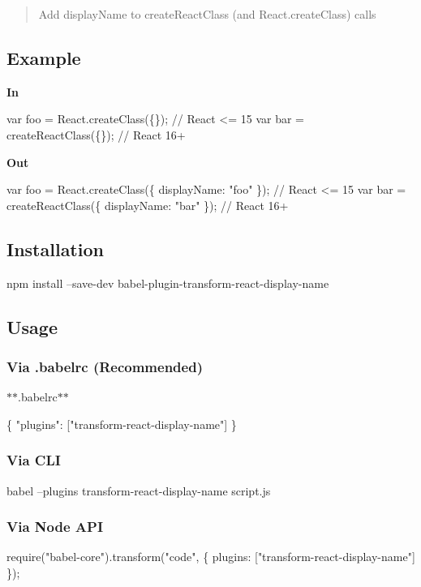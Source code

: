 \begin{quote}
Add display\+Name to {\ttfamily create\+React\+Class} (and {\ttfamily React.\+create\+Class}) calls \end{quote}


\subsection*{Example}

{\bfseries In}


\begin{DoxyCode}
var foo = React.createClass(\{\}); // React <= 15
var bar = createReactClass(\{\});  // React 16+
\end{DoxyCode}


{\bfseries Out}


\begin{DoxyCode}
var foo = React.createClass(\{
  displayName: "foo"
\}); // React <= 15
var bar = createReactClass(\{
  displayName: "bar"
\}); // React 16+
\end{DoxyCode}


\subsection*{Installation}


\begin{DoxyCode}
npm install --save-dev babel-plugin-transform-react-display-name
\end{DoxyCode}


\subsection*{Usage}

\subsubsection*{Via {\ttfamily .babelrc} (Recommended)}

$\ast$$\ast$.babelrc$\ast$$\ast$


\begin{DoxyCode}
\{
  "plugins": ["transform-react-display-name"]
\}
\end{DoxyCode}


\subsubsection*{Via C\+LI}


\begin{DoxyCode}
babel --plugins transform-react-display-name script.js
\end{DoxyCode}


\subsubsection*{Via Node A\+PI}


\begin{DoxyCode}
require("babel-core").transform("code", \{
  plugins: ["transform-react-display-name"]
\});
\end{DoxyCode}
 